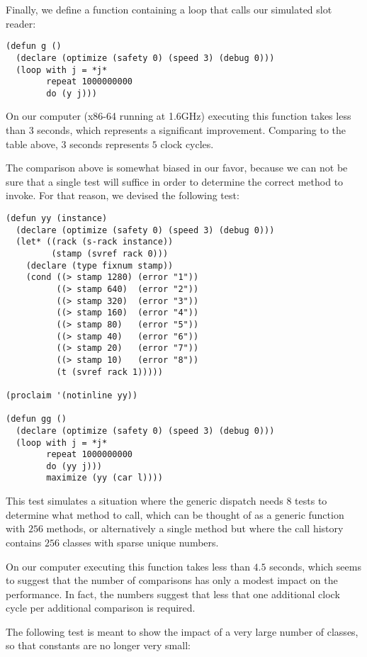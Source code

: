 Finally, we define a function containing a loop that calls our
simulated slot reader:

\begin{verbatim}
(defun g ()
  (declare (optimize (safety 0) (speed 3) (debug 0)))
  (loop with j = *j*
        repeat 1000000000
        do (y j)))
\end{verbatim}

On our computer (x86-64 running at 1.6GHz) executing this function
takes less than $3$ seconds, which represents a significant
improvement.  Comparing to the table above, $3$ seconds represents $5$
clock cycles. 

The comparison above is somewhat biased in our favor, because we can
not be sure that a single test will suffice in order to determine the
correct method to invoke.  For that reason, we devised the following
test: 

\begin{verbatim}
(defun yy (instance)
  (declare (optimize (safety 0) (speed 3) (debug 0)))
  (let* ((rack (s-rack instance))
         (stamp (svref rack 0)))
    (declare (type fixnum stamp))
    (cond ((> stamp 1280) (error "1"))
          ((> stamp 640)  (error "2"))
          ((> stamp 320)  (error "3"))
          ((> stamp 160)  (error "4"))
          ((> stamp 80)   (error "5"))
          ((> stamp 40)   (error "6"))
          ((> stamp 20)   (error "7"))
          ((> stamp 10)   (error "8"))
          (t (svref rack 1)))))

(proclaim '(notinline yy))

(defun gg ()
  (declare (optimize (safety 0) (speed 3) (debug 0)))
  (loop with j = *j*
        repeat 1000000000
        do (yy j)))
        maximize (yy (car l))))
\end{verbatim}

This test simulates a situation where the generic dispatch needs $8$
tests to determine what method to call, which can be thought of as a
generic function with $256$ methods, or alternatively a single method
but where the call history contains $256$ classes with sparse unique
numbers. 

On our computer executing this function takes less than $4.5$ seconds,
which seems to suggest that the number of comparisons has only a
modest impact on the performance.  In fact, the numbers suggest that
less that one additional clock cycle per additional comparison is
required.

The following test is meant to show the impact of a very large number
of classes, so that constants are no longer very small:

